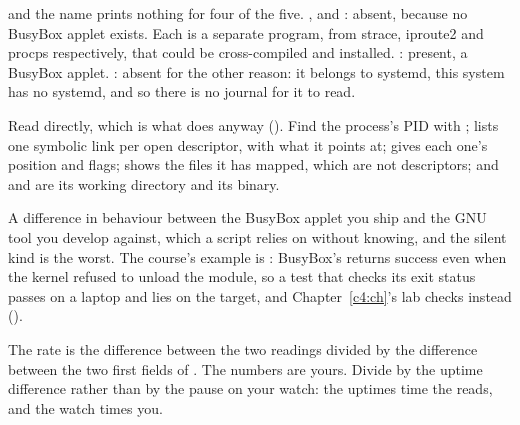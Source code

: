   and the name prints nothing for four of the five.
,  and : absent, because no BusyBox applet exists. Each is a
separate program, from strace, iproute2 and procps respectively, that could be cross-compiled and
installed. : present, a BusyBox applet. : absent for the other reason:
it belongs to systemd, this system has no systemd, and so there is no journal for it to read.

 Read  directly, which is what  does anyway ().
Find the process's PID with ;  lists one symbolic link per open
descriptor, with what it points at;  gives each one's position and flags;
 shows the files it has mapped, which are not descriptors; and  and
 are its working directory and its binary.

 A difference in behaviour between the BusyBox applet you ship and the GNU tool you develop
against, which a script relies on without knowing, and the silent kind is the worst. The course's
example is : BusyBox's returns success even when the kernel refused to unload the
module, so a test that checks its exit status passes on a laptop and lies on the target, and
Chapter~\ref{c4:ch}'s lab checks  instead ().


 The rate is the difference between the two  readings divided by the difference
between the two first fields of . The numbers are yours. Divide by the uptime
difference rather than by the pause on your watch: the uptimes time the reads, and the watch times
you.


